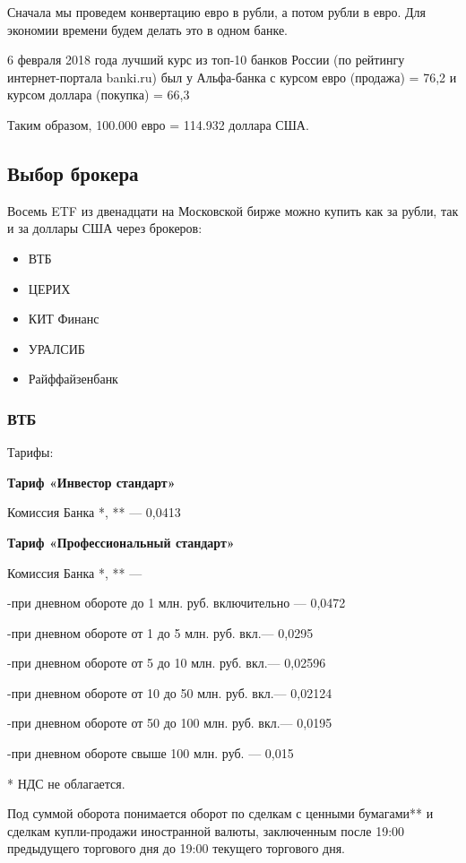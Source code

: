 Сначала мы проведем конвертацию евро в рубли, а потом рубли в евро. Для экономии времени будем делать это в одном банке.

6 февраля 2018 года лучший курс из топ-10 банков России (по рейтингу интернет-портала banki.ru) был у Альфа-банка с курсом евро (продажа) = 76,2 и курсом доллара (покупка) = 66,3

Таким образом, 100.000 евро = 114.932 доллара США.

\subsection{Выбор брокера}

Восемь ETF из двенадцати на Московской бирже можно купить как за рубли, так и за доллары США через брокеров:

\begin{itemize}
	\item ВТБ
	\item ЦЕРИХ
	\item КИТ Финанс
	\item УРАЛСИБ
	\item Райффайзенбанк
\end{itemize}

\subsubsection{ВТБ}

Тарифы:

\textbf{Тариф «Инвестор стандарт»}

Комиссия Банка *, ** — 0,0413%

\textbf{Тариф «Профессиональный стандарт»}

Комиссия Банка *, ** —

-при дневном обороте до 1 млн. руб. включительно — 0,0472%

-при дневном обороте от 1 до 5 млн. руб. вкл.— 0,0295%

-при дневном обороте от 5 до 10 млн. руб. вкл.— 0,02596%

-при дневном обороте от 10 до 50 млн. руб. вкл.— 0,02124%

-при дневном обороте от 50 до 100 млн. руб. вкл.— 0,0195%

-при дневном обороте свыше 100 млн. руб. — 0,015%

* НДС не облагается.

Под суммой оборота понимается оборот по сделкам с ценными бумагами** и сделкам купли-продажи иностранной валюты, заключенным после 19:00 предыдущего торгового дня до 19:00 текущего торгового дня.


